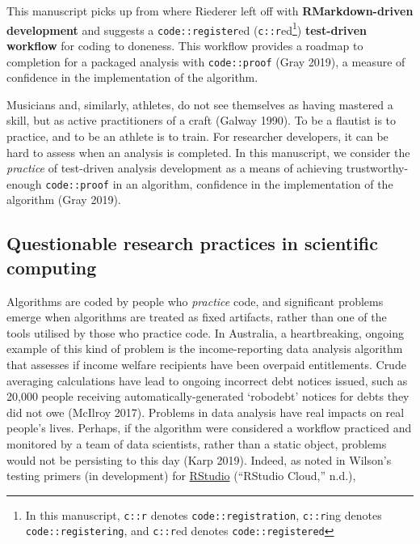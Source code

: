 \documentclass[
]{article}
\begin{document}
This manuscript picks up from where Riederer left off with \textbf{RMarkdown-driven development} and suggests a \texttt{code::register}ed (\texttt{c::r}ed\footnote{In this manuscript, \texttt{c::r} denotes \texttt{code::registration}, \texttt{c::r}ing denotes \texttt{code::registering}, and \texttt{c::r}ed denotes \texttt{code::registered}}) \textbf{test-driven workflow} for coding to doneness. This workflow provides a roadmap to completion for a packaged analysis with \texttt{code::proof} (Gray 2019), a measure of confidence in the implementation of the algorithm.

Musicians and, similarly, athletes, do not see themselves as having mastered a skill, but as active practitioners of a craft (Galway 1990). To be a flautist is to practice, and to be an athlete is to train. For researcher developers, it can be hard to assess when an analysis is completed. In this manuscript, we consider the \emph{practice} of test-driven analysis development as a means of achieving trustworthy-enough \texttt{code::proof} in an algorithm, confidence in the implementation of the algorithm (Gray 2019).

\hypertarget{questionable-research-practices-in-scientific-computing}{%
\subsection{Questionable research practices in scientific computing}\label{questionable-research-practices-in-scientific-computing}}

Algorithms are coded by people who \emph{practice} code, and significant problems emerge when algorithms are treated as fixed artifacts, rather than one of the tools utilised by those who practice code. In Australia, a heartbreaking, ongoing example of this kind of problem is the income-reporting data analysis algorithm that assesses if income welfare recipients have been overpaid entitlements. Crude averaging calculations have lead to ongoing incorrect debt notices issued, such as 20,000 people receiving automatically-generated `robodebt' notices for debts they did not owe (McIlroy 2017). Problems in data analysis have real impacts on real people's lives. Perhaps, if the algorithm were considered a workflow practiced and monitored by a team of data scientists, rather than a static object, problems would not be persisting to this day (Karp 2019). Indeed, as noted in Wilson's testing primers (in development) for \href{https://rstudio.cloud/learn/primers}{RStudio} (``RStudio Cloud,'' n.d.),
\end{document}
